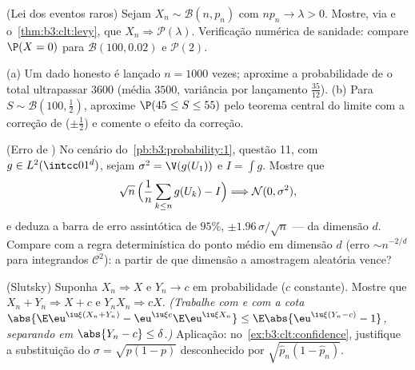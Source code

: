 \begin{exercise}[$\star\star$]\label{exo:b3:clt:5}
(Lei dos eventos raros) Sejam $X_n \sim \mathcal B(n, p_n)$ com $np_n \to \lambda > 0$. Mostre, via  e o~\cref{thm:b3:clt:levy}, que $X_n \Rightarrow \mathcal
P(\lambda)$. Verificação numérica de
sanidade: compare $\P(X = 0)$ para $\mathcal B(100, 0.02)$ e $\mathcal P(2)$.
\end{exercise}

\begin{exercise}[$\star\star$]\label{exo:b3:clt:6}
(a) Um dado honesto é lançado $n = 1000$ vezes; aproxime a probabilidade de o
total ultrapassar $3600$ (média $3500$, variância por lançamento
$\frac{35}{12}$).
(b) Para $S \sim \mathcal B(100, \frac12)$, aproxime $\P(45 \leq S \leq 55)$ pelo teorema central do limite com a
correção de  ($\pm\frac12$) e comente o efeito da correção.
\end{exercise}

\begin{exercise}[$\star\star$]\label{exo:b3:clt:7}
(Erro de ) No cenário do~\cref{pb:b3:probability:1}, questão 11, com
$g \in
L^2(\intcc01^d)$, sejam $\sigma^2 = \V(g(U_1))$ e $I = \int
g$. Mostre que
\[
\sqrt n\,\Bigl(\frac1n\sum_{k\leq n}g(U_k) - I\Bigr)
\Longrightarrow \mathcal N(0, \sigma^2),
\]
e deduza a barra de erro assintótica de $95\%$, $\pm
1.96\,\sigma/\sqrt n$ ---
 da dimensão $d$. Compare com a regra determinística do
ponto médio em dimensão $d$ (erro $\sim n^{-2/d}$ para integrandos $\mathcal C^2$): a
partir de que dimensão a amostragem aleatória vence?
\end{exercise}

\begin{exercise}[$\star\star\star$]\label{exo:b3:clt:8}
(Slutsky) Suponha $X_n \Rightarrow X$ e $Y_n \to c$ em probabilidade ($c$ constante).
Mostre que $X_n + Y_n \Rightarrow X +
c$ e $Y_nX_n \Rightarrow cX$. \emph{(Trabalhe com  e
com a cota $\abs{\E\eu^{\iu\xi
(X_n+Y_n)} - \eu^{\iu\xi c}\E\eu^{\iu\xi X_n}} \leq
\E\abs{\eu^{\iu\xi(Y_n - c)} - 1}$, separando em $\abs{Y_n - c}
\leq \delta$.)} Aplicação: no~\cref{ex:b3:clt:confidence},
justifique a substituição do $\sigma = \sqrt{p(1-p)}$ desconhecido por $\sqrt{\hat p_n(1 - \hat
p_n)}$.
\end{exercise}

